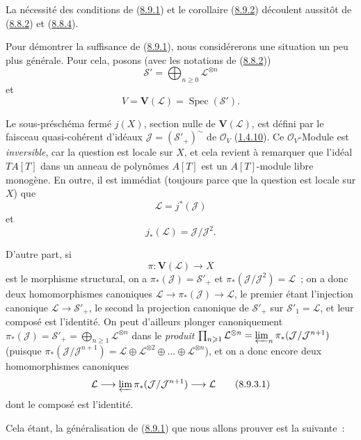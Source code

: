 \begin{env}[8.9.3]
\label{II.8.9.3-fr}
La nécessité des conditions de (\hyperref[II.8.9.1-fr]{8.9.1}) et le
corollaire (\hyperref[II.8.9.2-fr]{8.9.2}) découlent aussitôt de
(\hyperref[II.8.8.2-fr]{8.8.2}) et
(\hyperref[II.8.8.4-fr]{8.8.4}).

Pour démontrer la suffisance de (\hyperref[II.8.9.1-fr]{8.9.1}), nous
considérerons une situation un peu plus générale. Pour cela, posons (avec les
notations de (\hyperref[II.8.8.2-fr]{8.8.2}))
\[
  \mathcal{S}'=\bigoplus_{n\geqslant 0}\mathcal{L}^{\otimes n}
\]
et
\[
  V=\mathbf{V}(\mathcal{L})=\operatorname{Spec}(\mathcal{S}').
\]

Le sous-préschéma fermé $j(X)$, section nulle de $\mathbf{V}(\mathcal{L})$,
est défini par le faisceau quasi-cohérent d'idéaux
$\mathcal{J}=(\mathcal{S}'_+)^{\sim}$ de $\mathcal{O}_V$
(\hyperref[II.1.4.10-fr]{1.4.10}). Ce $\mathcal{O}_V$-Module est
\emph{inversible}, car la question est locale sur $X$, et cela revient à
remarquer que l'idéal $TA[T]$ dans un anneau de polynômes $A[T]$ est un
$A[T]$-module libre monogène. En outre, il est immédiat (toujours parce que la
question est locale sur $X$) que
\[
  \mathcal{L}=j^*(\mathcal{J})
\]
et
\[
  j_*(\mathcal{L})=\mathcal{J}/\mathcal{J}^2.
\]

D'autre part, si
\[
  \pi:\mathbf{V}(\mathcal{L})\longrightarrow X
\]
est le morphisme structural, on a
$\pi_*(\mathcal{J})=\mathcal{S}'_+$ et
$\pi_*(\mathcal{J}/\mathcal{J}^2)=\mathcal{L}$~; on a donc deux
homomorphismes canoniques
$\mathcal{L}\to\pi_*(\mathcal{J})\to\mathcal{L}$, le premier étant
l'injection canonique $\mathcal{L}\to\mathcal{S}'_+$, le second la projection
canonique de $\mathcal{S}'_+$ sur $\mathcal{S}'_1=\mathcal{L}$, et leur
composé est l'identité. On peut d'ailleurs plonger canoniquement
$\pi_*(\mathcal{J})=\mathcal{S}'_+=\bigoplus_{n\geqslant 1}\mathcal{L}^{\otimes n}$
dans le \emph{produit}
$\prod_{n\geqslant 1}\mathcal{L}^{\otimes n}=\varprojlim_n\pi_*(\mathcal{J}/\mathcal{J}^{n+1})$
(puisque
$\pi_*(\mathcal{J}/\mathcal{J}^{n+1})=
\mathcal{L}\oplus\mathcal{L}^{\otimes2}\oplus\ldots\oplus
\mathcal{L}^{\otimes n}$), et on a donc encore deux homomorphismes canoniques
\begin{equation}
\label{II.8.9.3.1-fr}
  \mathcal{L}\longrightarrow
  \varprojlim\pi_*(\mathcal{J}/\mathcal{J}^{n+1})
  \longrightarrow\mathcal{L}
\tag{8.9.3.1}
\end{equation}
dont le composé est l'identité.

Cela étant, la généralisation de (\hyperref[II.8.9.1-fr]{8.9.1}) que nous
allons prouver est la suivante~:
\end{env}

